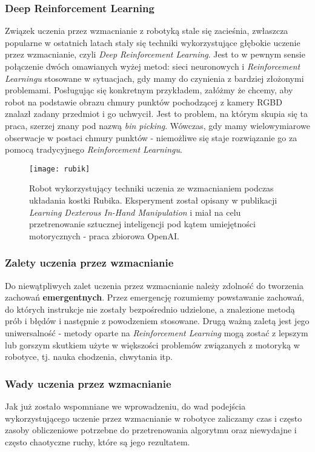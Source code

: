 \documentclass[12pt]{article}
\begin{document}
\subsubsection*{Deep Reinforcement Learning}
Związek uczenia przez wzmacnianie z robotyką stale się zacieśnia, zwłaszcza popularne w ostatnich latach stały się techniki wykorzystujące głębokie uczenie przez wzmacnianie, czyli \emph{Deep Reinforcement Learning}. Jest to w pewnym sensie połączenie dwóch omawianych wyżej metod: sieci neuronowych i \emph{Reinforcement Learningu} stosowane w sytuacjach, gdy mamy do czynienia z bardziej złożonymi problemami. Posługując się konkretnym przykładem, załóżmy że chcemy, aby robot na podstawie obrazu chmury punktów pochodzącej z kamery RGBD znalazł zadany przedmiot i go uchwycił. Jest to problem, na którym skupia się ta praca, szerzej znany pod nazwą \emph{bin picking}. Wówczas, gdy mamy wielowymiarowe obserwacje w postaci chmury punktów - niemożliwe się staje rozwiązanie go za pomocą tradycyjnego \emph{Reinforcement Learningu}. 

\begin{figure}[h]
\centering
\texttt{[image: rubik]}
\caption{Robot wykorzystujący techniki uczenia ze wzmacnianiem podczas układania kostki Rubika. Eksperyment został opisany w publikacji \emph{Learning Dexterous In-Hand Manipulation} i miał na celu przetrenowanie sztucznej inteligencji pod kątem umiejętności motorycznych - praca zbiorowa OpenAI.}
\end{figure}

\newpage
\subsubsection*{Zalety uczenia przez wzmacnianie}
Do niewątpliwych zalet uczenia przez wzmacnianie należy zdolność do tworzenia zachowań \textbf{emergentnych}. Przez emergencję rozumiemy powstawanie zachowań, do których instrukcje nie zostały bezpośrednio udzielone, a znalezione metodą prób i błędów i następnie z powodzeniem stosowane. Drugą ważną zaletą jest jego uniwersalność - metody oparte na \emph{Reinforcement Learning} mogą zostać z lepszym lub gorszym skutkiem użyte w większości problemów związanych z motoryką w robotyce, tj. nauka chodzenia, chwytania itp.

\subsubsection*{Wady uczenia przez wzmacnianie}
Jak już zostało wspomniane we wprowadzeniu, do wad podejścia wykorzystującego uczenie przez wzmacnianie w robotyce zaliczamy czas i często zasoby obliczeniowe potrzebne do przetrenowania algorytmu oraz niewydajne i często chaotyczne ruchy, które są jego rezultatem.
\end{document}
